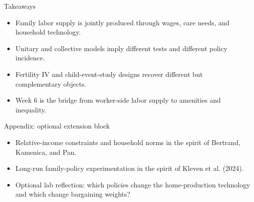 \documentclass[aspectratio=169,11pt]{beamer}
\begin{document}
\begin{frame}{Takeaways}
\begin{itemize}
    \item Family labor supply is jointly produced through wages, care needs, and household technology.
    \item Unitary and collective models imply different tests and different policy incidence.
    \item Fertility IV and child-event-study designs recover different but complementary objects.
    \item Week 6 is the bridge from worker-side labor supply to amenities and inequality.
\end{itemize}
\end{frame}

\appendix

\begin{frame}{Appendix: optional extension block}
\begin{itemize}
    \item Relative-income constraints and household norms in the spirit of Bertrand, Kamenica, and Pan.
    \item Long-run family-policy experimentation in the spirit of Kleven et al. (2024).
    \item Optional lab reflection: which policies change the home-production technology and which change bargaining weights?
\end{itemize}
\end{frame}
\end{document}
